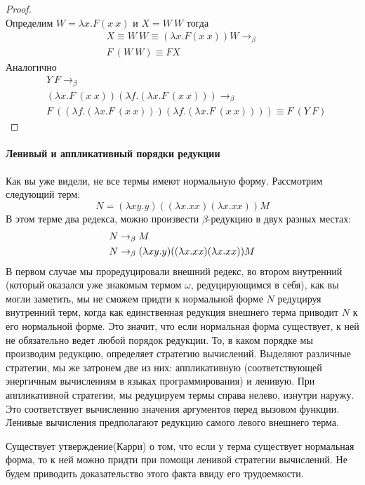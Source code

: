 \documentclass[lambda.tex]{subfiles}
\begin{document}
\begin{proof}
~\\
Определим $W = \lambda x.F(x\ x)$ и $X = W\ W$ тогда
\begin{align*}
X \equiv W\ W \equiv (\lambda x.F(x\ x))W \rightarrow_\beta\\
F\ (W\ W) \equiv F X
\end{align*}
Аналогично
\begin{align*}
&Y\ F \rightarrow_\beta\\
&(\lambda x.F\ (x\ x)) (\lambda f.(\lambda x.F\ (x\ x))) \rightarrow_\beta\\
&F\ ((\lambda f.(\lambda x.F\ (x\ x))) (\lambda f.(\lambda x.F\ (x\ x)))) \equiv F\ (Y\ F)
\end{align*}
\end{proof}

\paragraph{Ленивый и аппликативный порядки редукции} %
\label{par:lazy and energic reduction}

Как вы уже видели, не все термы имеют нормальную форму. Рассмотрим следующий терм:
\begin{equation*}
	N = (\lambda x y.y) ((\lambda x.xx)(\lambda x.xx)) M
\end{equation*}
В этом терме два редекса, можно произвести $\beta$-редукцию в двух разных местах:
\begin{align*}
	N &\rightarrow_\beta M\\
	N &\rightarrow_\beta (\lambda x y.y) ((\lambda x.xx)(\lambda x.xx)) M
\end{align*}
В первом случае мы проредуцировали внешний редекс, во втором внутренний (который оказался уже знакомым термом $\omega$, редуцирующимся в себя), как вы могли заметить, мы не сможем придти к нормальной форме $N$ редуцируя внутренний терм, когда как единственная редукция внешнего терма приводит $N$ к его нормальной форме. Это значит, что если нормальная форма существует, к ней не обязательно ведет любой порядок редукции. То, в каком порядке мы производим редукцию, определяет стратегию вычислений. Выделяют различные стратегии, мы же затронем две из них: аппликативную (соответствующей энергичным вычислениям в языках программирования) и ленивую.
При аппликативной стратегии, мы редуцируем термы справа нелево, изнутри наружу. Это соответствует вычислению значения аргументов перед вызовом функции.
Ленивые вычисления предполагают редукцию самого левого внешнего терма.

Существует утверждение(Карри) о том, что если у терма существует нормальная форма, то к ней можно придти при помощи ленивой стратегии вычислений. Не будем приводить доказательство этого факта ввиду его трудоемкости. 
\end{document}
